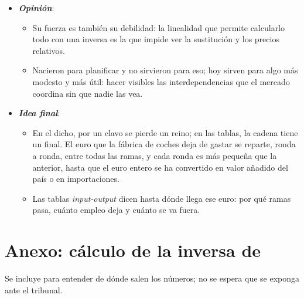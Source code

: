 \documentclass[11pt]{article}
\begin{document}
\begin{itemize}
\begin{itemize}
  \item Sus eslabonamientos están en el origen de la teoría del desarrollo , y su versión multirregional mide las cadenas globales de valor  y el lugar de España en ellas .
  \end{itemize}
\item \textbf{\emph{Opinión}}:
  \begin{itemize}
  \item Su fuerza es también su debilidad: la linealidad que permite calcularlo todo con una inversa es la que impide ver la sustitución y los precios relativos.
  \item Nacieron para planificar y no sirvieron para eso; hoy sirven para algo más modesto y más útil: hacer visibles las interdependencias que el mercado coordina sin que nadie las vea.
  \end{itemize}
\item \textbf{\emph{Idea final}}:
  \begin{itemize}
  \item En el dicho, por un clavo se pierde un reino; en las tablas, la cadena tiene un final. El euro que la fábrica de coches deja de gastar se reparte, ronda a ronda, entre todas las ramas, y cada ronda es más pequeña que la anterior, hasta que el euro entero se ha convertido en valor añadido del país o en importaciones.
  \item Las tablas \emph{input-output} dicen hasta dónde llega ese euro: por qué ramas pasa, cuánto empleo deja y cuánto se va fuera.
  \end{itemize}
\end{itemize}

\clearpage
\appendix

\section{Anexo: cálculo de la inversa de }\label{anexo:inversa}

\begin{notaopositor}
Se incluye para entender de dónde salen los números; no se espera que se exponga ante el tribunal.
\end{notaopositor}
\end{document}
